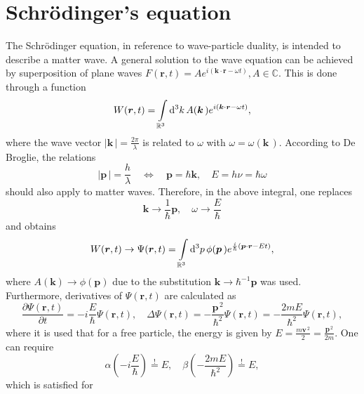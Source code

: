 \documentclass{report}
\numberwithin{tm}{section}
\newcommand\vect[1]{\ensuremath{\bm{#1}}}
\begin{document}
	\section{Schrödinger's equation}
	The Schrödinger equation, in reference to wave-particle duality, is intended to describe a matter wave. A general solution to the wave equation can be achieved by superposition of plane waves $F(\vect{r},t) = Ae^{i(\vect{k}\cdot\vect{r}-\omega t)}, A \in \mathbb{C}$. This is done through a function \begin{equation}
		W(\vect{r},t) = \int\displaylimits_{\mathbb{R}^3}\mathrm{d}^3k \, A(\vect{k}\,) e^{i(\vect{k}\cdot\vect{r}-\omega t)},
	\end{equation} where the wave vector $|\vect{k}\,| = \frac{2\pi}{\lambda}$ is related to $\omega$ with $\omega = \omega(\vect{k}\,)$. According to De Broglie, the relations \begin{equation}
		|\vect{p}\,| = \frac{h}{\lambda} \quad \Leftrightarrow \quad \vect{p} = \hbar \vect{k} , \quad E = h\nu = \hbar \omega
	\end{equation} should also apply to matter waves. Therefore, in the above integral, one replaces \begin{equation}
		\vect{k} \rightarrow \frac{1}{\hbar}\vect{p}, \quad \omega \rightarrow \frac{E}{\hbar}
	\end{equation} and obtains \begin{equation}
		W(\vect{r},t) \rightarrow \Psi(\vect{r},t) = \int\displaylimits_{\mathbb{R}^3} \mathrm{d}^3p \, \phi(\vect{p}\,) e^{\frac{i}{\hbar}(\vect{p}\cdot\vect{r}-E t)},
	\end{equation} where $A(\vect{k}) \rightarrow \phi(\vect{p})$ due to the substitution $\vect{k} \rightarrow \hbar^{-1}\vect{p}$ was used. Furthermore, derivatives of $\Psi(\vect{r},t)$ are calculated as \begin{equation}
		\frac{\partial \Psi(\vect{r},t)}{\partial t} = -i\frac{E}{\hbar} \Psi(\vect{r},t),\quad \Delta \Psi(\vect{r},t) = -\frac{\vect{p}^{\,2}}{\hbar^2}\Psi(\vect{r},t) = -\frac{2mE}{\hbar^2}\Psi(\vect{r},t),
	\end{equation} where it is used that for a free particle, the energy is given by $E = \frac{m\vect{v}^{\,2}}{2} = \frac{\vect{p}^{\,2}}{2m}$. One can require \begin{equation}\alpha \left(-i\frac{E}{\hbar}\right) \overset{!}{=} E, \quad \beta \left(-\frac{2mE}{\hbar^2}\right) \overset{!}{=} E, \end{equation} which is satisfied for \begin{equation}

\end{equation}
\end{document}
